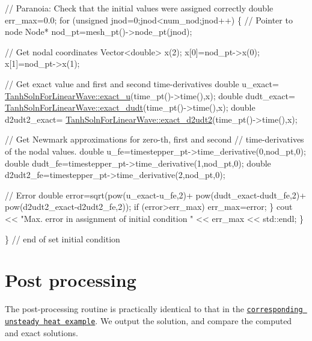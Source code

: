 \begin{DoxyCodeInclude}


   \textcolor{comment}{// Paranoia: Check that the initial values were assigned correctly}
   \textcolor{keywordtype}{double} err\_max=0.0;
   \textcolor{keywordflow}{for} (\textcolor{keywordtype}{unsigned} jnod=0;jnod<num\_nod;jnod++)
    \{
     \textcolor{comment}{// Pointer to node}
     Node* nod\_pt=mesh\_pt()->node\_pt(jnod);

     \textcolor{comment}{// Get nodal coordinates}
     Vector<double> x(2);
     x[0]=nod\_pt->x(0);
     x[1]=nod\_pt->x(1);

     \textcolor{comment}{// Get exact value and first and second time-derivatives}
     \textcolor{keywordtype}{double} u\_exact=
      \hyperlink{namespaceTanhSolnForLinearWave_aceea2935b2d3815ce72aae8c9de2b468}{TanhSolnForLinearWave::exact\_u}(time\_pt()->time(),x);
     \textcolor{keywordtype}{double} dudt\_exact=
      \hyperlink{namespaceTanhSolnForLinearWave_aa2081bd3d3d518a38497f664b0e498bc}{TanhSolnForLinearWave::exact\_dudt}(time\_pt()->time(),x);
     \textcolor{keywordtype}{double} d2udt2\_exact=
      \hyperlink{namespaceTanhSolnForLinearWave_a63b7a0f5fd5d06cc2c0a43322a81fe43}{TanhSolnForLinearWave::exact\_d2udt2}(time\_pt()->time(),x);
    
     \textcolor{comment}{// Get Newmark approximations for zero-th, first and second }
     \textcolor{comment}{// time-derivatives of the nodal values. }
     \textcolor{keywordtype}{double} u\_fe=timestepper\_pt->time\_derivative(0,nod\_pt,0);
     \textcolor{keywordtype}{double} dudt\_fe=timestepper\_pt->time\_derivative(1,nod\_pt,0);
     \textcolor{keywordtype}{double} d2udt2\_fe=timestepper\_pt->time\_derivative(2,nod\_pt,0);
     
     \textcolor{comment}{// Error}
     \textcolor{keywordtype}{double} error=sqrt(pow(u\_exact-u\_fe,2)+
                       pow(dudt\_exact-dudt\_fe,2)+
                       pow(d2udt2\_exact-d2udt2\_fe,2));
     \textcolor{keywordflow}{if} (error>err\_max) err\_max=error;
    \}
   cout << \textcolor{stringliteral}{"Max. error in assignment of initial condition "} 
        << err\_max << std::endl;   
  \}


\} \textcolor{comment}{// end of set initial condition}

\end{DoxyCodeInclude}




 

\hypertarget{index_doc}{}\section{Post processing}\label{index_doc}
The post-\/processing routine is practically identical to that in the \href{../../../unsteady_heat/two_d_unsteady_heat/html/index.html}{\tt corresponding unsteady heat example}. We output the solution, and compare the computed and exact solutions.


